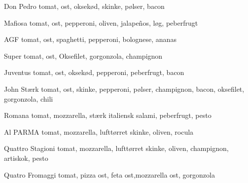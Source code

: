 \begin{multicols}{2}
\begin{enumdescription}
  \item[Don Pedro] tomat, ost, oksekød, skinke, pølser, bacon
  \item[Mafiosa] tomat, ost, pepperoni, oliven, jalapeños, løg,
    peberfrugt
  \item[AGF] tomat, ost, spaghetti, pepperoni, bolognese, ananas
  \item[Super] tomat, ost, Oksefilet, gorgonzola, champignon
  \item[Juventus] tomat, ost, oksekød, pepperoni, peberfrugt, bacon
  \item[John Stærk] tomat, ost, skinke, pepperoni, pølser, champignon,
    bacon, oksefilet, gorgonzola, chili
  \item[Romana] tomat, mozzarella, stærk italiensk salami, peberfrugt,
    pesto
  \item[Al PARMA] tomat, mozzarella, lufttørret skinke, oliven, rocula
  \item[Quattro Stagioni] tomat, mozzarella, lufttørret skinke,
    oliven, champignon, artiskok, pesto
  \item[Quatro Fromaggi] tomat, pizza ost, feta ost,mozzarella ost,
    gorgonzola
  \end{enumdescription}
\end{multicols}



